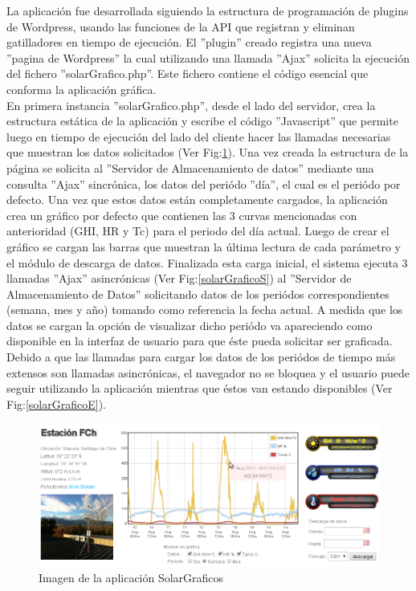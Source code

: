 La aplicación fue desarrollada siguiendo la estructura de programación de plugins de Wordpress\cite{aplicacion:wplugins}, usando las funciones de la API que registran y eliminan gatilladores en tiempo de ejecución. El ''plugin'' creado registra una nueva ''pagina de Wordpress'' la cual utilizando una llamada ''Ajax'' solicita la ejecución del fichero ''solarGrafico.php''. Este fichero contiene el código esencial que conforma la aplicación gráfica.\\

En primera instancia ''solarGrafico.php'', desde el lado del servidor, crea la estructura estática de la aplicación y escribe el código ''Javascript'' que permite luego en tiempo de ejecución del lado del cliente hacer las llamadas necesarias que muestran los datos solicitados (Ver Fig:\ref{solarGraficoFoto1}). Una vez creada la estructura de la página se solicita al ''Servidor de Almacenamiento de datos'' mediante una consulta ''Ajax'' sincrónica, los datos del periódo ''día'', el cual es el periódo por defecto. Una vez que estos datos están completamente cargados, la aplicación crea un gráfico por defecto que contienen las 3 curvas mencionadas con anterioridad (GHI, HR y Tc) para el periodo del día actual. Luego de crear el gráfico se cargan las barras que muestran la última lectura de cada parámetro y el módulo de descarga de datos. Finalizada esta carga inicial, el sistema ejecuta 3 llamadas ''Ajax'' asincrónicas (Ver Fig:\ref{solarGraficoS}) al ''Servidor de Almacenamiento de Datos'' solicitando datos de los periódos correspondientes (semana, mes y año) tomando como referencia la fecha actual. A medida que los datos se cargan la opción de visualizar dicho periódo va apareciendo como disponible en la interfaz de usuario para que éste pueda solicitar ser graficada. Debido a que las llamadas para cargar los datos de los periódos de tiempo más extensos son llamadas asincrónicas, el navegador no se bloquea y el usuario puede seguir utilizando la aplicación mientras que éstos van estando disponibles (Ver Fig:\ref{solarGraficoE}).

\begin{figure}[h!]
        \centering
        \includegraphics[scale=0.5]{images/solarGrafico}
        \caption{Imagen de la aplicación SolarGraficos}
        \label{solarGraficoFoto1}
\end{figure}
\newpage

